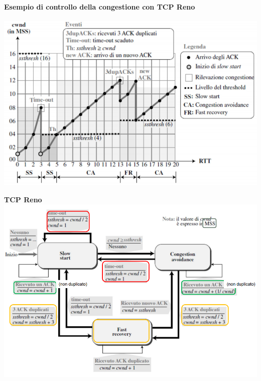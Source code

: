 \documentclass[10pt]{article}
\begin{document}
\paragraph{Esempio di controllo della congestione con TCP Reno}
\begin{center}
\includegraphics[scale=0.75]{congestionerenoesempio.png}
\pagebreak

\textbf{TCP Reno}\\
\includegraphics[scale=0.65]{tcpreno.png}
\end{center}
\end{document}
